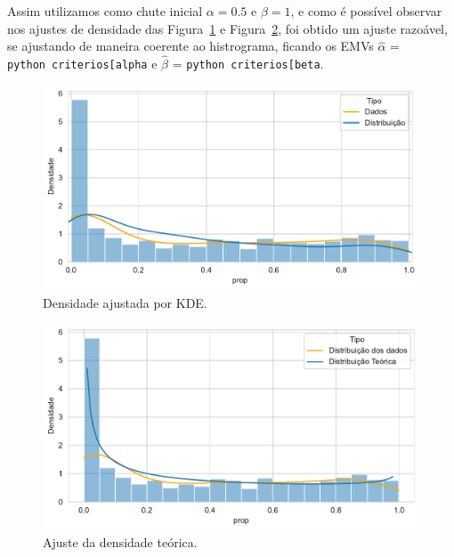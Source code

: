 \documentclass[
]{article}
\begin{document}
Assim utilizamos como chute inicial \(\alpha = 0.5\) e \(\beta = 1\), e
como é possível observar nos ajustes de densidade das
Figura~\ref{fig-kde} e Figura~\ref{fig-theoric-density}, foi obtido um
ajuste razoável, se ajustando de maneira coerente ao histrograma,
ficando os EMVs \(\widehat{\alpha}\) =
\texttt{python\ criterios{[}\textquotesingle{}alpha\textquotesingle{}{]}}
e \(\widehat{\beta}\) =
\texttt{python\ criterios{[}\textquotesingle{}beta\textquotesingle{}{]}}.

\begin{figure}[H]

{\centering \includegraphics{report_files/figure-pdf/fig-kde-output-1.pdf}

}

\caption{\label{fig-kde}Densidade ajustada por KDE.}

\end{figure}

\begin{figure}[H]

{\centering \includegraphics{report_files/figure-pdf/fig-theoric-density-output-1.pdf}

}

\caption{\label{fig-theoric-density}Ajuste da densidade teórica.}

\end{figure}
\end{document}
